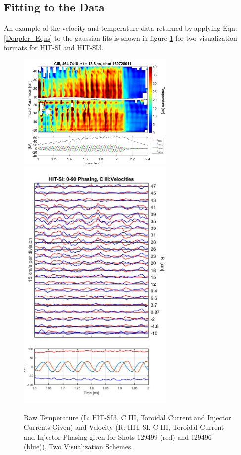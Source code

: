 \documentclass{AIAA}
\begin{document}
\subsection{Fitting to the Data}\label{sec::DataFit}
\hspace{4ex}An example of the velocity and temperature data returned by applying Eqn.\ref{Doppler_Eqns} to the gaussian fits is shown in figure \ref{Fig::Raw_VelTemp} for two visualization formats for HIT-SI and HIT-SI3.
\begin{figure}
\includegraphics[width=3in]{160728011L2Temp}\nolinebreak
\includegraphics[width=3in]{129499_Lines}\caption{Raw Temperature (L: HIT-SI3, C III, Toroidal Current and Injector Currents Given) and Velocity (R: HIT-SI, C III, Toroidal Current and Injector Phasing given for Shots 129499 (red) and 129496 (blue)), Two Visualization Schemes.}\label{Fig::Raw_VelTemp}
\end{figure}
\end{document}
